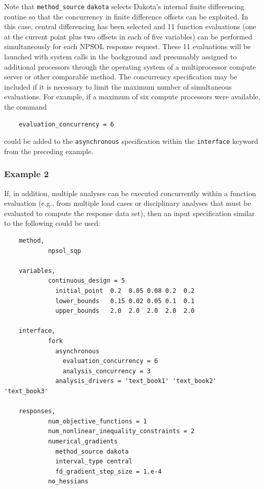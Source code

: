 Note that \texttt{method\_source} \texttt{dakota} selects Dakota's
internal finite differencing routine so that the concurrency in finite
difference offsets can be exploited. In this case, central
differencing has been selected and 11 function evaluations (one at the
current point plus two offsets in each of five variables) can be
performed simultaneously for each NPSOL response request. These 11
evaluations will be launched with system calls in the background and
presumably assigned to additional processors through the operating
system of a multiprocessor compute server or other comparable method.
The concurrency specification may be included if it is necessary to
limit the maximum number of simultaneous evaluations. For example, if
a maximum of six compute processors were available, the command
\begin{small}
\begin{verbatim}
    evaluation_concurrency = 6
\end{verbatim}
\end{small}
could be added to the \texttt{asynchronous} specification within the
\texttt{interface} keyword from the preceding example.

\subsubsection{Example 2}\label{parallel:spec:single:example2}

If, in addition, multiple analyses can be executed concurrently within
a function evaluation (e.g., from multiple load cases or disciplinary
analyses that must be evaluated to compute the response data set),
then an input specification similar to the following could be used:
\begin{small}
\begin{verbatim}
    method,
            npsol_sqp

    variables,
            continuous_design = 5
              initial_point  0.2  0.05 0.08 0.2  0.2
              lower_bounds   0.15 0.02 0.05 0.1  0.1
              upper_bounds   2.0  2.0  2.0  2.0  2.0

    interface,
            fork
              asynchronous
                evaluation_concurrency = 6
                analysis_concurrency = 3
              analysis_drivers = 'text_book1' 'text_book2' 'text_book3'

    responses,
            num_objective_functions = 1
            num_nonlinear_inequality_constraints = 2
            numerical_gradients
              method_source dakota
              interval_type central
              fd_gradient_step_size = 1.e-4
            no_hessians
\end{verbatim}
\end{small}

